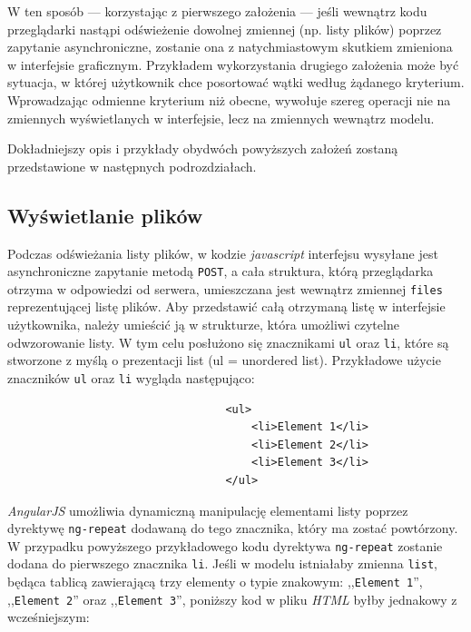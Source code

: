 W ten sposób --- korzystając z pierwszego założenia --- jeśli wewnątrz kodu przeglądarki nastąpi odświeżenie dowolnej zmiennej (np. listy plików) poprzez zapytanie asynchroniczne, zostanie ona z natychmiastowym skutkiem zmieniona w interfejsie graficznym. Przykładem wykorzystania drugiego założenia może być sytuacja, w której użytkownik chce posortować wątki według żądanego kryterium. Wprowadzając odmienne kryterium niż obecne, wywołuje szereg operacji nie na zmiennych wyświetlanych w interfejsie, lecz na zmiennych wewnątrz modelu.

Dokładniejszy opis i przykłady obydwóch powyższych założeń zostaną przedstawione w następnych podrozdziałach.

\subsection{Wyświetlanie plików}

Podczas odświeżania listy plików, w kodzie \emph{javascript} interfejsu wysyłane jest asynchroniczne zapytanie metodą \texttt{POST}, a cała struktura, którą przeglądarka otrzyma w odpowiedzi od serwera, umieszczana jest wewnątrz zmiennej \texttt{files} reprezentującej listę plików. Aby przedstawić całą otrzymaną listę w interfejsie użytkownika, należy umieścić ją w strukturze, która umożliwi czytelne odwzorowanie listy. W tym celu posłużono się znacznikami \texttt{ul} oraz \texttt{li}, które są stworzone z myślą o prezentacji list (ul = unordered list). Przykładowe użycie znaczników \texttt{ul} oraz \texttt{li} wygląda następująco:

\begin{figure}[htb]
\begin{verbatim}
                            <ul>
                                <li>Element 1</li>
                                <li>Element 2</li>
                                <li>Element 3</li>
                            </ul>
\end{verbatim}
\end{figure}

\emph{AngularJS} umożliwia dynamiczną manipulację elementami listy poprzez dyrektywę \texttt{ng-repeat} dodawaną do tego znacznika, który ma zostać powtórzony. W przypadku powyższego przykładowego kodu dyrektywa \texttt{ng-repeat} zostanie dodana do pierwszego znacznika \texttt{li}. Jeśli w modelu istniałaby zmienna \texttt{list}, będąca tablicą zawierającą trzy elementy o typie znakowym: ,,\texttt{Element 1}'', ,,\texttt{Element 2}'' oraz ,,\texttt{Element 3}'', poniższy kod w pliku \emph{HTML} byłby jednakowy z wcześniejszym:

